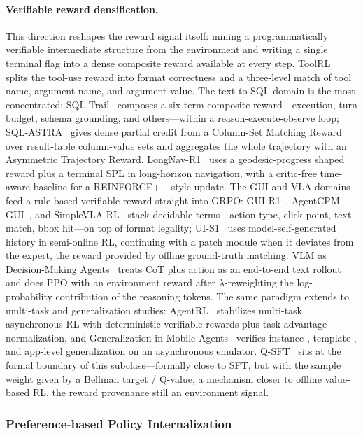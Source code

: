 \paragraph{Verifiable reward densification.} This direction reshapes the reward signal itself: mining a programmatically verifiable intermediate structure from the environment and writing a single terminal flag into a dense composite reward available at every step. ToolRL~\cite{Qia25b} splits the tool-use reward into format correctness and a three-level match of tool name, argument name, and argument value. The text-to-SQL domain is the most concentrated: SQL-Trail~\cite{Hua26d} composes a six-term composite reward---execution, turn budget, schema grounding, and others---within a reason-execute-observe loop; SQL-ASTRA~\cite{Li26r} gives dense partial credit from a Column-Set Matching Reward over result-table column-value sets and aggregates the whole trajectory with an Asymmetric Trajectory Reward. LongNav-R1~\cite{Hu26e} uses a geodesic-progress shaped reward plus a terminal SPL in long-horizon navigation, with a critic-free time-aware baseline for a REINFORCE++-style update. The GUI and VLA domains feed a rule-based verifiable reward straight into GRPO: GUI-R1~\cite{Luo25b}, AgentCPM-GUI~\cite{Zha25an}, and SimpleVLA-RL~\cite{Li25aa} stack decidable terms---action type, click point, text match, bbox hit---on top of format legality; UI-S1~\cite{Lu25j} uses model-self-generated history in semi-online RL, continuing with a patch module when it deviates from the expert, the reward provided by offline ground-truth matching. VLM as Decision-Making Agents~\cite{Zha24s} treats CoT plus action as an end-to-end text rollout and does PPO with an environment reward after $\lambda$-reweighting the log-probability contribution of the reasoning tokens. The same paradigm extends to multi-task and generalization studies: AgentRL~\cite{Zha25ag} stabilizes multi-task asynchronous RL with deterministic verifiable rewards plus task-advantage normalization, and Generalization in Mobile Agents~\cite{Gu26b} verifies instance-, template-, and app-level generalization on an asynchronous emulator. Q-SFT~\cite{Hon24} sits at the formal boundary of this subclass---formally close to SFT, but with the sample weight given by a Bellman target / Q-value, a mechanism closer to offline value-based RL, the reward provenance still an environment signal.

\subsubsection{Preference-based Policy Internalization}

